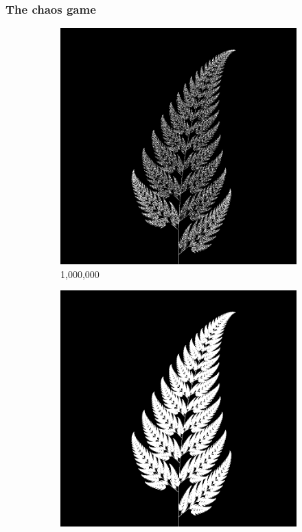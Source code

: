 \documentclass[11pt]{article}
\begin{document}
\subsubsection{The chaos game}
\label{sec:org033f677}
\label{subsection:chaos_game}

\begin{figure}
     \centering
     \begin{subfigure}[b]{0.4\textwidth}
         \centering
         \includegraphics[width=\textwidth]{figures/barnsley_1000000}
         \caption{1,000,000}
         \label{figure:barnsley_mil}
     \end{subfigure}
     \hfill
     \begin{subfigure}[b]{0.4\textwidth}
         \centering
         \includegraphics[width=\textwidth]{figures/barnsley_100000000}

\end{subfigure}
\end{figure}
\end{document}
